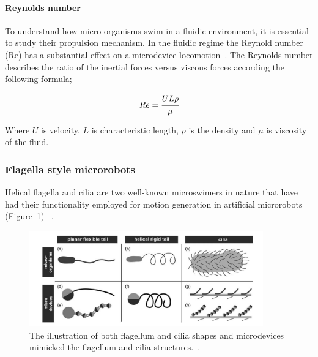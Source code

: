 \documentclass[12pt,a4paper,titlepage]{report}
\begin{document}
\paragraph{Reynolds number}

To understand how micro organisms swim in a fluidic environment, it is essential to study their propulsion 
mechanism. In the fluidic regime the Reynold number (Re) has a substantial effect on a microdevice
locomotion~\citep{peyer2013magnetic}. The Reynolds number describes the ratio of the inertial forces versus viscous 
forces according the following formula;

\begin{equation}
  Re = \cfrac{UL\rho}{\mu}
\label{eq:4}
\end{equation}
 
Where $ U$ is velocity, $L$ is characteristic length, $\rho$ is the density and $\mu$ is viscosity of the fluid.






\subsubsection{Flagella style microrobots}

Helical flagella and cilia are two well-known microswimers in nature that have had their functionality employed 
for motion generation in artificial microrobots  (Figure~\ref{cilia}) ~\citep{gao2013bioinspired}. 



\begin{figure}
  \centering
    \includegraphics[width=0.9\textwidth]{cilia}
  \caption{The illustration of both flagellum and cilia shapes and microdevices mimicked the flagellum and cilia 
structures.~\citep{peyer2013bio}.}
  \label{cilia}
\end{figure}


 
\paragraph{}
\end{document}
